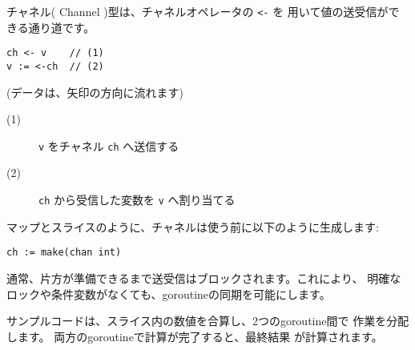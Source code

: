 チャネル( Channel )型は、チャネルオペレータの \texttt{<-} を
用いて値の送受信ができる通り道です。

\begin{lstlisting}[numbers=none]
ch <- v    // (1)
v := <-ch  // (2)
\end{lstlisting}
(データは、矢印の方向に流れます)
\begin{description}
\item[(1)] \texttt{v} をチャネル \texttt{ch} へ送信する
\item[(2)] \texttt{ch} から受信した変数を \texttt{v} へ割り当てる
\end{description}

マップとスライスのように、チャネルは使う前に以下のように生成します:

\begin{lstlisting}[numbers=none]
ch := make(chan int)
\end{lstlisting}

通常、片方が準備できるまで送受信はブロックされます。これにより、
明確なロックや条件変数がなくても、goroutineの同期を可能にします。

サンプルコードは、スライス内の数値を合算し、2つのgoroutine間で
作業を分配します。 両方のgoroutineで計算が完了すると、最終結果
が計算されます。